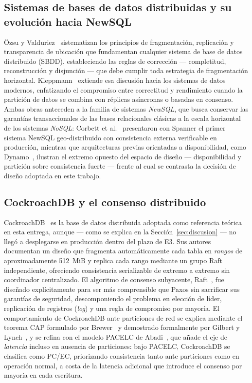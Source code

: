 \documentclass[12pt,a4paper]{article}
\begin{document}
\subsection{Sistemas de bases de datos distribuidas y su evolución hacia NewSQL}

Özsu y Valduriez~\cite{ozsu2020principles} sistematizan los principios de
fragmentación, replicación y transparencia de ubicación que fundamentan
cualquier sistema de base de datos distribuido (SBDD), estableciendo las
reglas de corrección --- completitud, reconstrucción y disjunción --- que
debe cumplir toda estrategia de fragmentación horizontal. Kleppmann~\cite{kleppmann2017designing}
extiende esa discusión hacia los sistemas de datos modernos, enfatizando el
compromiso entre correctitud y rendimiento cuando la partición de datos se
combina con réplicas asíncronas o basadas en consenso. Ambas obras anteceden
a la familia de sistemas \emph{NewSQL}, que busca conservar las garantías
transaccionales de las bases relacionales clásicas a la escala horizontal de
los sistemas \emph{NoSQL}: Corbett et al.~\cite{corbett2012spanner}
presentaron con Spanner el primer sistema NewSQL geo-distribuido con
consistencia externa verificable en producción, mientras que arquitecturas
previas orientadas a disponibilidad, como Dynamo~\cite{decandia2007dynamo},
ilustran el extremo opuesto del espacio de diseño --- disponibilidad y
partición sobre consistencia fuerte --- frente al cual se contrasta la
decisión de diseño adoptada en este trabajo.

\subsection{CockroachDB y el consenso distribuido}

CockroachDB~\cite{taft2020cockroachdb} es la base de datos distribuida
adoptada como referencia teórica en esta entrega, aunque --- como se explica
en la Sección~\ref{sec:discusion} --- no llegó a desplegarse en producción
dentro del plazo de E3. Sus autores documentan un diseño que fragmenta
automáticamente cada tabla en \emph{rangos} de aproximadamente 512~MiB y
replica cada rango mediante un grupo Raft independiente, ofreciendo
consistencia serializable de extremo a extremo sin coordinador centralizado.
El algoritmo de consenso subyacente, Raft~\cite{ongaro2014raft}, fue
diseñado explícitamente para ser más comprensible que Paxos sin sacrificar
sus garantías de seguridad, descomponiendo el problema en elección de líder,
replicación de registros (\emph{log}) y una regla de compromiso por mayoría.
El comportamiento de CockroachDB ante particiones de red se explica mediante
el teorema CAP formulado por Brewer~\cite{brewer2012cap} y demostrado
formalmente por Gilbert y Lynch~\cite{gilbertlynch2002brewer}, y se refina
con el modelo PACELC de Abadi~\cite{abadi2012consistency}, que añade el eje
de \emph{latencia} incluso en ausencia de particiones: bajo PACELC,
CockroachDB se clasifica como PC/EC, priorizando consistencia tanto ante
particiones como en operación normal, a costa de la latencia adicional que
introduce el consenso por mayoría en cada escritura.
\end{document}
